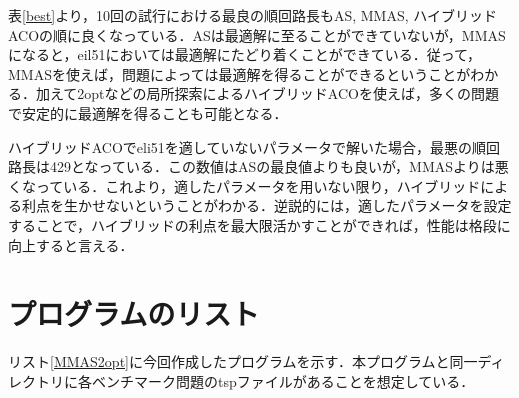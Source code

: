 \documentclass[a4j]{jsarticle}
\begin{document}
\par
表\ref{best}より，10回の試行における最良の順回路長もAS, MMAS, ハイブリッドACOの順に良くなっている．ASは最適解に至ることができていないが，MMASになると，eil51においては最適解にたどり着くことができている．従って，MMASを使えば，問題によっては最適解を得ることができるということがわかる．加えて2optなどの局所探索によるハイブリッドACOを使えば，多くの問題で安定的に最適解を得ることも可能となる．
\par
ハイブリッドACOでeli51を適していないパラメータで解いた場合，最悪の順回路長は429となっている．この数値はASの最良値よりも良いが，MMASよりは悪くなっている．これより，適したパラメータを用いない限り，ハイブリッドによる利点を生かせないということがわかる．逆説的には，適したパラメータを設定することで，ハイブリッドの利点を最大限活かすことができれば，性能は格段に向上すると言える．


















\section{プログラムのリスト}
リスト\ref{MMAS2opt}に今回作成したプログラムを示す．本プログラムと同一ディレクトリに各ベンチマーク問題のtspファイルがあることを想定している．
\end{document}
